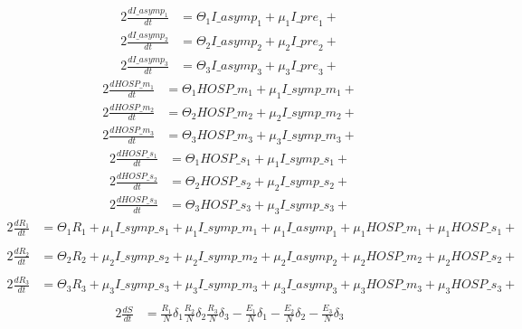 \documentclass{article}%
\begin{document}
\begin{alignat*}{2}%
\frac{dI\_asymp_{1}}{dt} &= \Theta_{1}I\_{asymp}_{1} +  \mu_{1}I\_{pre}_{1} +%
\end{alignat*}%
\begin{alignat*}{2}%
\frac{dI\_asymp_{2}}{dt} &= \Theta_{2}I\_{asymp}_{2} +  \mu_{2}I\_{pre}_{2} +%
\end{alignat*}%
\begin{alignat*}{2}%
\frac{dI\_asymp_{3}}{dt} &= \Theta_{3}I\_{asymp}_{3} +  \mu_{3}I\_{pre}_{3} +%
\end{alignat*}%
\begin{alignat*}{2}%
\frac{dHOSP\_m_{1}}{dt} &= \Theta_{1}HOSP\_{m}_{1} +  \mu_{1}I\_{symp}\_{m}_{1} +%
\end{alignat*}%
\begin{alignat*}{2}%
\frac{dHOSP\_m_{2}}{dt} &= \Theta_{2}HOSP\_{m}_{2} +  \mu_{2}I\_{symp}\_{m}_{2} +%
\end{alignat*}%
\begin{alignat*}{2}%
\frac{dHOSP\_m_{3}}{dt} &= \Theta_{3}HOSP\_{m}_{3} +  \mu_{3}I\_{symp}\_{m}_{3} +%
\end{alignat*}%
\begin{alignat*}{2}%
\frac{dHOSP\_s_{1}}{dt} &= \Theta_{1}HOSP\_{s}_{1} +  \mu_{1}I\_{symp}\_{s}_{1} +%
\end{alignat*}%
\begin{alignat*}{2}%
\frac{dHOSP\_s_{2}}{dt} &= \Theta_{2}HOSP\_{s}_{2} +  \mu_{2}I\_{symp}\_{s}_{2} +%
\end{alignat*}%
\begin{alignat*}{2}%
\frac{dHOSP\_s_{3}}{dt} &= \Theta_{3}HOSP\_{s}_{3} +  \mu_{3}I\_{symp}\_{s}_{3} +%
\end{alignat*}%
\begin{alignat*}{2}%
\frac{dR_{1}}{dt} &= \Theta_{1}R_{1} +  \mu_{1}I\_{symp}\_{s}_{1} +  \mu_{1}I\_{symp}\_{m}_{1} +  \mu_{1}I\_{asymp}_{1} +  \mu_{1}HOSP\_{m}_{1} +  \mu_{1}HOSP\_{s}_{1} +  \\ &%
\end{alignat*}%
\begin{alignat*}{2}%
\frac{dR_{2}}{dt} &= \Theta_{2}R_{2} +  \mu_{2}I\_{symp}\_{s}_{2} +  \mu_{2}I\_{symp}\_{m}_{2} +  \mu_{2}I\_{asymp}_{2} +  \mu_{2}HOSP\_{m}_{2} +  \mu_{2}HOSP\_{s}_{2} +  \\ &%
\end{alignat*}%
\begin{alignat*}{2}%
\frac{dR_{3}}{dt} &= \Theta_{3}R_{3} +  \mu_{3}I\_{symp}\_{s}_{3} +  \mu_{3}I\_{symp}\_{m}_{3} +  \mu_{3}I\_{asymp}_{3} +  \mu_{3}HOSP\_{m}_{3} +  \mu_{3}HOSP\_{s}_{3} +  \\ &%
\end{alignat*}%
\begin{alignat*}{2}%
\frac{dS}{dt} &= \frac{R_{1}}{N} \delta_{1}\frac{R_{2}}{N} \delta_{2}\frac{R_{3}}{N} \delta_{3}-\frac{E_{1}}{N} \delta_{1}-\frac{E_{2}}{N} \delta_{2}-\frac{E_{3}}{N} \delta_{3}%
\end{alignat*}%
\end{document}

